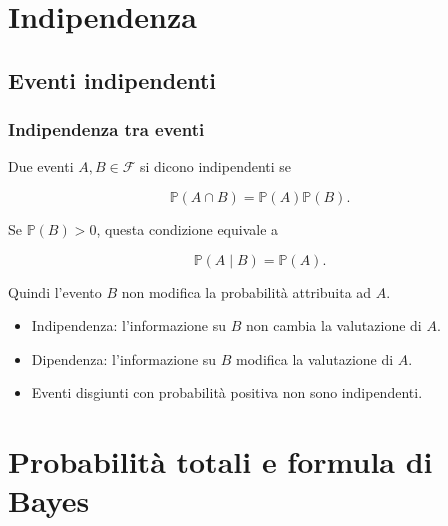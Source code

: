 \documentclass[handout]{beamer}%
\newenvironment{stepitemize}{\begin{itemize}[<+->]}{\end{itemize} }
\providecommand{\Prob}{\mathbb{P}}
\providecommand{\F}{\mathcal{F}}
\providecommand{\1}{\mathbf{1}}
\providecommand{\QTR}[2]{\csname #1\endcsname{#2}}
\begin{document}


\section{Indipendenza}

\subsection{Eventi indipendenti}%

\begin{frame}%
%

\frametitle{Indipendenza tra eventi}%


Due eventi $A,B\in\F$ si dicono indipendenti se%

\[
\Prob(A\cap B)=\Prob(A)\Prob(B).
\]


\medskip

Se $\Prob(B)>0$, questa condizione equivale a%

\[
\Prob(A\mid B)=\Prob(A).
\]


\medskip

Quindi l'evento $B$ non modifica la probabilit\`{a} attribuita ad $A$.

\medskip

\begin{stepitemize}
\item Indipendenza: l'informazione su $B$ non cambia la valutazione di $A$.

\item Dipendenza: l'informazione su $B$ modifica la valutazione di $A$.

\item Eventi disgiunti con probabilit\`{a} positiva non sono indipendenti.
\end{stepitemize}%

\transboxout
\end{frame}%




\section{Probabilit\`{a} totali e formula di Bayes}
\end{document}
